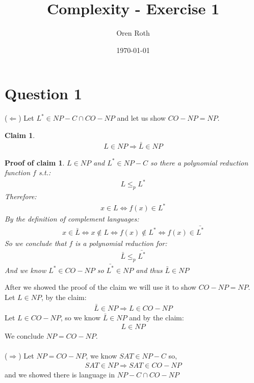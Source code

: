 \documentclass[11pt]{article}
\title{Complexity - Exercise 1}
\author{Oren Roth}
\date{\today}
\theoremstyle{plain}
\newtheorem{claim}{Claim}[theorem]
\theoremstyle{nonumberplainnobrackets}
\newtheorem{claimproof}{Proof of claim}
\begin{document}
\maketitle
\section*{Question 1}
 ($\Leftarrow$) Let $L^* \in NP-C \cap CO-NP$ and let us show $CO-NP=NP$.
	\begin{claim}
\begin{align*}
L \in NP \Rightarrow \bar{L} \in NP
\end{align*}
\end{claim}
\begin{claimproof}
$L\in NP$ and $L^* \in NP-C$ so there a polynomial reduction function $f$ s.t.:
\begin{align*}
	L \le_p L^*
\end{align*}
Therefore:
\begin{align*}
x\in L \iff f(x)\in L^*
\end{align*}
By the definition of complement languages:
\begin{align*}
x\in \bar{L} \iff x\notin L \iff f(x)\notin L^* \iff f(x)\in  \bar{L^*}
\end{align*}
So we conclude that $f$ is a polynomial reduction for:
\begin{align*}
\bar{L} \le_p \bar{L^*}
\end{align*}
And we know $L^*\in CO-NP$ so $\bar{L^*} \in NP$ and thus $\bar{L}\in NP$ 
\end{claimproof}
After we showed the proof of the claim we will use it to show $CO-NP=NP$.
Let $L\in NP$, by the claim:
\begin{align*}
\bar{L} \in NP \Rightarrow L \in CO-NP
\end{align*}
Let $L\in CO-NP$, so we know $\bar{L}\in NP$ and by the claim:
\begin{align*}
L \in NP
\end{align*}
We conclude $NP=CO-NP$.\\
\\
($\Rightarrow$) Let $NP=CO-NP$, we know $SAT\in NP-C$ so,
\begin{align*}
SAT \in NP \Rightarrow SAT \in CO-NP 
\end{align*} 
and we showed there is language in $NP-C \cap CO-NP$
\end{document}
